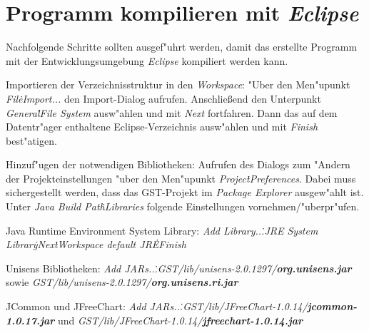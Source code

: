 \chapter{Programm kompilieren mit \emph{Eclipse}}

Nachfolgende Schritte sollten ausgef"uhrt werden, damit das erstellte Programm mit der Entwicklungsumgebung \emph{Eclipse} kompiliert werden kann.
\begin{enumerate}
	{%
	\renewcommand{\theenumi}{\arabic{enumi}}
	\renewcommand{\labelenumi}{{\theenumi}.}
	\item Importieren der Verzeichnisstruktur in den \emph{Workspace}:
		  "Uber den Men"upunkt \emph{File\.\chemarrow Import...} den Import-Dialog aufrufen.
		  Anschlie{\ss}end den Unterpunkt \emph{General\.\chemarrow File System} ausw"ahlen und mit \emph{Next} fortfahren.
		  Dann das auf dem Datentr"ager enthaltene Eclipse-Verzeichnis ausw"ahlen und mit \emph{Finish} best"atigen.
	\item Hinzuf"ugen der notwendigen Bibliotheken:
		  Aufrufen des Dialogs zum "Andern der Projekteinstellungen "uber den Men"upunkt \emph{Project\.\chemarrow Preferences}.
		  Dabei muss sichergestellt werden, dass das GST-Projekt im \emph{Package Explorer} ausgew"ahlt ist.
		  Unter \emph{Java Build Path\.\chemarrow Libraries} folgende Einstellungen vornehmen/"uberpr"ufen.
		\begin{enumerate}
			{%
			\renewcommand{\theenumii}{\arabic{enumii}}
			\renewcommand{\labelenumii}{{\theenumii}.}
			\item Java Runtime Environment System Library: \emph{Add Library...\.\chemarrow JRE System Library\.\chemarrow Next\.\chemarrow Workspace default JRE\.\chemarrow Finish}
			\item Unisens Bibliotheken: \emph{Add JARs...\.\chemarrow GST/lib/unisens-2.0.1297/\textbf{org.unisens.jar}} sowie \emph{GST/lib/unisens-2.0.1297/\textbf{org.unisens.ri.jar}}
			\item JCommon und JFreeChart: \emph{Add JARs...\.\chemarrow GST/lib/JFreeChart-1.0.14/\textbf{jcommon-1.0.17.jar}} und \emph{GST/lib/JFreeChart-1.0.14/\textbf{jfreechart-1.0.14.jar}}
			}
		\end{enumerate}
	}
\end{enumerate}